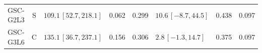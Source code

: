 \documentclass[10pt,a4paper]{article}
\begin{document}
\begin{longtable}{lcp{37mm}rrp{37mm}rr}
GSC-G2L3 & S & \(109.1\,[52.7,218.1]\) & 0.062 & 0.299 & \(10.6\,[-8.7,44.5]\) & 0.438 & 0.097\\
GSC-G3L6 & C & \(135.1\,[36.7,237.1]\) & 0.156 & 0.306 & \(2.8\,[-1.3,14.7]\) & 0.375 & 0.097\\

\end{longtable}
\end{document}
